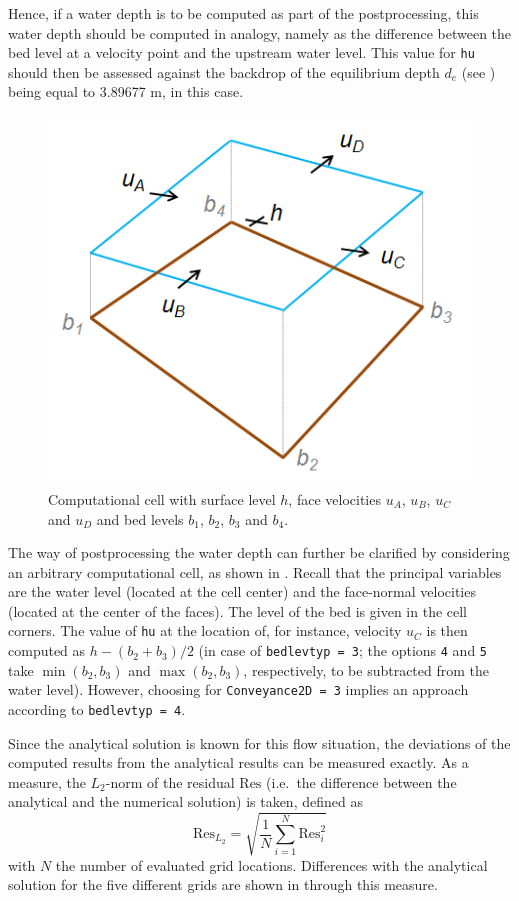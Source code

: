 Hence, if a water depth is to be computed as part of the postprocessing, this water depth should be computed in analogy, namely as the difference between the bed level at a velocity point and the upstream water level. This value for \texttt{hu} should then be assessed against the backdrop of the equilibrium depth $d_e$ (see ) being equal to 3.89677 m, in this case. 

\begin{figure}[h!]
\begin{center}
\includegraphics[width=0.5\columnwidth]{figures/computationalcell.png}
\end{center}\caption{Computational cell with surface level $h$, face velocities $u_A$, $u_B$, $u_C$ and $u_D$ and bed levels $b_1$, $b_2$, $b_3$ and $b_4$. \label{fig:chezytrianglescell}}
\end{figure}

The way of postprocessing the water depth can further be clarified by considering an arbitrary computational cell, as shown in . Recall that the principal variables are the water level (located at the cell center) and the face-normal velocities (located at the center of the faces). The level of the bed is given in the cell corners. The value of \texttt{hu} at the location of, for instance, velocity $u_C$ is then computed as $h - (b_2 + b_3)/2$ (in case of \texttt{bedlevtyp = 3}; the options \texttt{4} and \texttt{5} take $\min(b_2,b_3)$ and $\max(b_2,b_3)$, respectively, to be subtracted from the water level). However, choosing for \texttt{Conveyance2D = 3} implies an approach according to \texttt{bedlevtyp = 4}.

Since the analytical solution is known for this flow situation, the deviations of the computed results from the analytical results can be measured exactly. As a measure, the $L_2$-norm of the residual $\mathrm{Res}$ (i.e.\ the difference between the analytical and the numerical solution) is taken, defined as
\begin{equation}
\mathrm{Res}_{L_2} = \sqrt{\frac{1}{N} \sum_{i=1}^N \mathrm{Res}_i^2}
\end{equation}
with $N$ the number of evaluated grid locations. Differences with the analytical solution for the five different grids are shown in  through this measure. 

